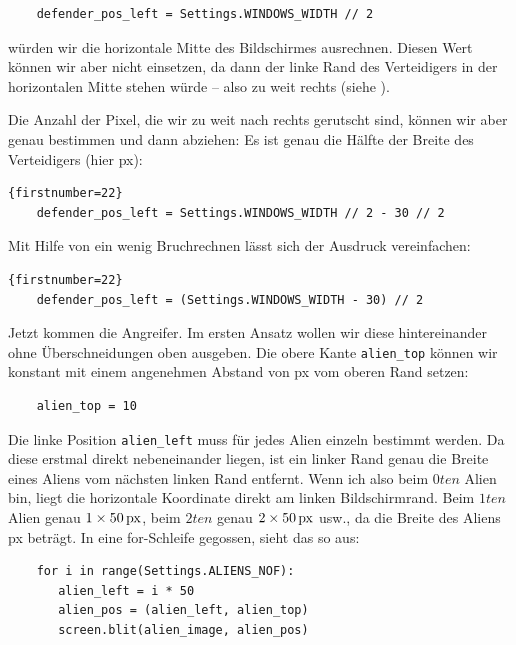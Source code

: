 \lstset{firstnumber=22}
\begin{lstlisting}
	defender_pos_left = Settings.WINDOWS_WIDTH // 2
\end{lstlisting}

würden wir die horizontale Mitte des Bildschirmes ausrechnen. Diesen Wert können wir aber nicht einsetzen, da dann der linke Rand des Verteidigers in der horizontalen Mitte stehen würde -- also zu weit rechts (siehe ). 


Die Anzahl der Pixel, die wir zu weit nach rechts gerutscht sind, können wir aber genau bestimmen und dann abziehen: Es ist genau die Hälfte der Breite des Verteidigers (hier \unit[30]{px}):
\begin{lstlisting}{firstnumber=22}
	defender_pos_left = Settings.WINDOWS_WIDTH // 2 - 30 // 2
\end{lstlisting}

Mit Hilfe von ein wenig Bruchrechnen lässt sich der Ausdruck vereinfachen:
\begin{lstlisting}{firstnumber=22}
	defender_pos_left = (Settings.WINDOWS_WIDTH - 30) // 2
\end{lstlisting}

Jetzt kommen die Angreifer. Im ersten Ansatz wollen wir diese hintereinander ohne Überschneidungen oben ausgeben. Die obere Kante \texttt{alien\_top} können wir konstant mit einem angenehmen Abstand von \unit[10]{px} vom oberen Rand setzen:

\lstset{firstnumber=40}
\begin{lstlisting}
	alien_top = 10 
\end{lstlisting}

Die linke Position \texttt{alien\_left} muss für jedes Alien einzeln bestimmt werden. Da diese erstmal direkt nebeneinander liegen, ist ein linker Rand genau die Breite eines Aliens vom nächsten linken Rand entfernt. Wenn ich also beim $0ten$ Alien bin, liegt die horizontale Koordinate direkt am linken Bildschirmrand. Beim $1ten$ Alien genau $1\times\unit[50]{px}$, beim $2ten$ genau $2\times\unit[50]{px}$ usw., da die Breite des Aliens \unit[50]{px} beträgt. In eine for-Schleife gegossen, sieht das so aus:

\lstset{firstnumber=41}
\begin{lstlisting}
	for i in range(Settings.ALIENS_NOF):
	   alien_left = i * 50
	   alien_pos = (alien_left, alien_top)
	   screen.blit(alien_image, alien_pos)
\end{lstlisting}


